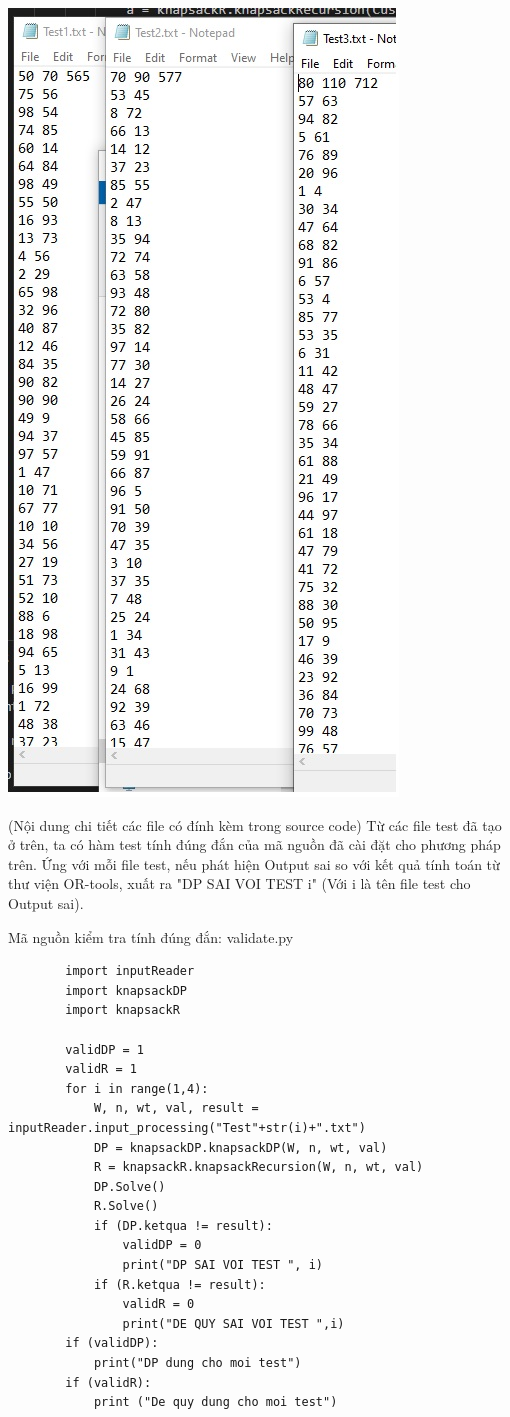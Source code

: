 \documentclass[12pt,a4paper]{report}
\begin{document}
    \includegraphics[scale=0.5]{test_showcase.jpg}

    (Nội dung chi tiết các file có đính kèm trong source code)
    Từ các file test đã tạo ở trên, ta có hàm test tính đúng đắn của mã nguồn đã 
    cài đặt cho phương pháp trên. Ứng với mỗi file test, nếu phát hiện Output sai
    so với kết quả tính toán từ thư viện OR-tools, xuất ra "DP SAI VOI TEST i" (Với i
    là tên file test cho Output sai).

    Mã nguồn kiểm tra tính đúng đắn: 
    validate.py
    \begin{lstlisting}
        import inputReader
        import knapsackDP
        import knapsackR

        validDP = 1
        validR = 1
        for i in range(1,4):
            W, n, wt, val, result = inputReader.input_processing("Test"+str(i)+".txt")
            DP = knapsackDP.knapsackDP(W, n, wt, val)
            R = knapsackR.knapsackRecursion(W, n, wt, val)
            DP.Solve()
            R.Solve()
            if (DP.ketqua != result):
                validDP = 0
                print("DP SAI VOI TEST ", i)
            if (R.ketqua != result):
                validR = 0
                print("DE QUY SAI VOI TEST ",i)
        if (validDP):
            print("DP dung cho moi test")
        if (validR):
            print ("De quy dung cho moi test")
    \end{lstlisting}
\end{document}
